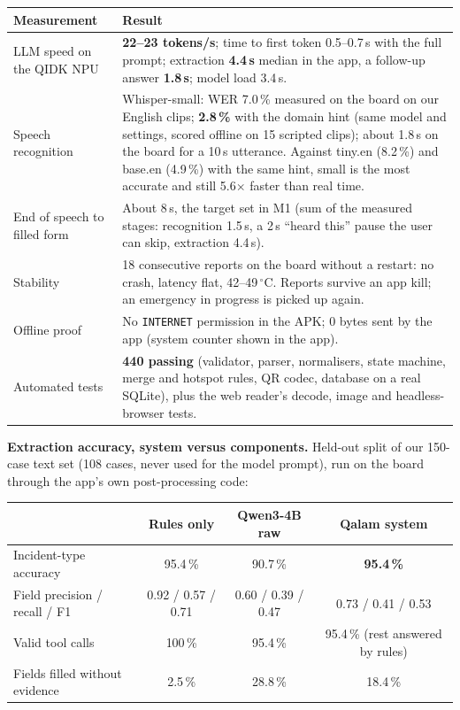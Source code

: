 \documentclass[9pt,a4paper]{extarticle}
\newcommand{\code}[1]{{\small\texttt{#1}}}
\begin{document}
\begin{tabularx}{\linewidth}{@{}p{4.4cm}L@{}}
\toprule
\textbf{Measurement} & \textbf{Result}\\
\midrule
LLM speed on the QIDK NPU & \textbf{22--23 tokens/s}; time to first token 0.5--0.7\,s with the full prompt; extraction \textbf{4.4\,s} median in the app, a follow-up answer \textbf{1.8\,s}; model load 3.4\,s.\\
Speech recognition & Whisper-small: WER 7.0\,\% measured on the board on our English clips; \textbf{2.8\,\%} with the domain hint (same model and settings, scored offline on 15 scripted clips); about 1.8\,s on the board for a 10\,s utterance. Against tiny.en (8.2\,\%) and base.en (4.9\,\%) with the same hint, small is the most accurate and still 5.6$\times$ faster than real time.\\
End of speech to filled form & About 8\,s, the target set in M1 (sum of the measured stages: recognition 1.5\,s, a 2\,s ``heard this'' pause the user can skip, extraction 4.4\,s).\\
Stability & 18 consecutive reports on the board without a restart: no crash, latency flat, 42--49\,$^\circ$C. Reports survive an app kill; an emergency in progress is picked up again.\\
Offline proof & No \code{INTERNET} permission in the APK; 0 bytes sent by the app (system counter shown in the app).\\
Automated tests & \textbf{440 passing} (validator, parser, normalisers, state machine, merge and hotspot rules, QR codec, database on a real SQLite), plus the web reader's decode, image and headless-browser tests.\\
\bottomrule
\end{tabularx}

\pagebreak
\textbf{Extraction accuracy, system versus components.} Held-out split of our 150-case text set (108 cases, never used for the model prompt), run on the board through the app's own post-processing code:

\begin{center}
\begin{tabular}{@{}lccc@{}}
\toprule
 & \textbf{Rules only} & \textbf{Qwen3-4B raw} & \textbf{Qalam system}\\
\midrule
Incident-type accuracy & 95.4\,\% & 90.7\,\% & \textbf{95.4\,\%}\\
Field precision / recall / F1 & 0.92 / 0.57 / 0.71 & 0.60 / 0.39 / 0.47 & 0.73 / 0.41 / 0.53\\
Valid tool calls & 100\,\% & 95.4\,\% & 95.4\,\% (rest answered by rules)\\
Fields filled without evidence & 2.5\,\% & 28.8\,\% & 18.4\,\%\\
\bottomrule
\end{tabular}
\end{center}
\end{document}
